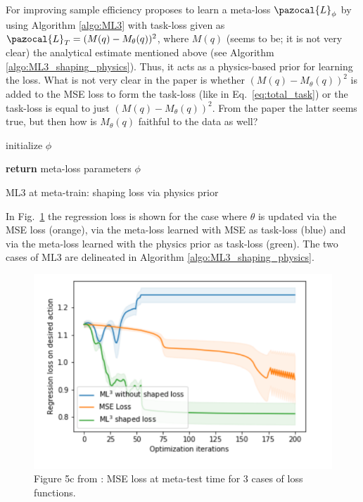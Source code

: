 For improving sample efficiency \textcite{bechtle2020metalearning} proposes to learn a meta-loss $\pazocal{L}_{\phi}$ by using Algorithm \ref{algo:ML3} with task-loss given as $\pazocal{L}_{T} = (M(q)-M_{\theta}(q))^2$, where $M(q)$ (seems to be; it is not very clear) the analytical estimate mentioned above (see Algorithm \ref{algo:ML3_shaping_physics}).
Thus, it acts as a physics-based prior for learning the loss.
What is not very clear in the paper is whether $(M(q)-M_{\theta}(q))^2$ is added to the MSE loss to form the task-loss (like in Eq.~\eqref{eq:total_task}) or the task-loss is equal to just $(M(q)-M_{\theta}(q))^2$.
From the paper the latter seems true, but then how is $M_{\theta}(q)$ faithful to the data as well?

\begin{algorithm}[H]
	\SetAlgoLined
	initialize $\phi$
	
	\textbf{return} meta-loss parameters $\phi$
	\caption{ML3 at meta-train: shaping loss via physics prior}
	\label{algo:ML3_shaping_physics}
\end{algorithm}

In Fig.~\ref{fig:fig5c} the regression loss is shown for the case where $\theta$ is updated via the MSE loss (orange), via the meta-loss learned with MSE as task-loss (blue) and via the meta-loss learned with the physics prior as task-loss (green).
The two cases of ML3 are delineated in Algorithm \ref{algo:ML3_shaping_physics}.
\begin{figure}[H]
	\centering
	\includegraphics[width=0.7\linewidth]{./Figures/fig5c.png}
	\caption{Figure 5c from \textcite{bechtle2020metalearning}: MSE loss at meta-test time for 3 cases of loss functions.}
	\label{fig:fig5c}
\end{figure}




\newpage	
\printbibliography[heading=bibintoc,title={References}]
	
